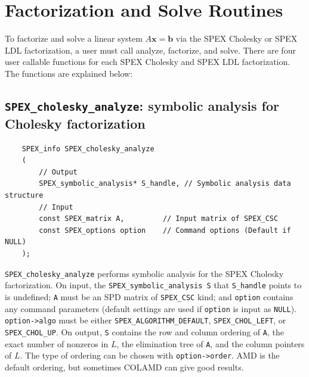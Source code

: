 \documentclass[12pt,oneside]{book}
\theoremstyle{definition}
\begin{document}
\section{Factorization and Solve Routines}

To factorize and solve a linear system $A \mathbf{x} = \mathbf{b}$ via the SPEX Cholesky or SPEX LDL factorization, a user must call analyze, factorize, and solve. There are four user callable functions for each SPEX Cholesky and SPEX LDL factorization. The functions are explained below:


\subsection{\texttt{SPEX\_cholesky\_analyze}: symbolic analysis for Cholesky factorization} \label{ss:spex_chol_analyze}
\begin{mdframed}[userdefinedwidth=\textwidth]
{\footnotesize
\begin{verbatim}
    SPEX_info SPEX_cholesky_analyze
    (
        // Output
        SPEX_symbolic_analysis* S_handle, // Symbolic analysis data structure 
        // Input
        const SPEX_matrix A,         // Input matrix of SPEX_CSC
        const SPEX_options option    // Command options (Default if NULL)
    );
    \end{verbatim}
} \end{mdframed}

\verb|SPEX_cholesky_analyze| performs symbolic analysis for the SPEX Cholesky factorization. On input, the \verb|SPEX_symbolic_analysis S| that  \verb|S_handle| points to is undefined;  \verb|A| must be an SPD matrix of \verb|SPEX_CSC| kind;  and \verb|option| contains any command parameters  (default settings are used if
\verb|option| is input as \verb|NULL|).  \verb|option->algo| must be either \verb|SPEX_ALGORITHM_DEFAULT|, \verb|SPEX_CHOL_LEFT|, or \verb|SPEX_CHOL_UP|. On output, \verb|S| contains the row and column ordering of \verb|A|, the exact number of nonzeros in $L$, the elimination tree of \verb|A|, and the column pointers of $L$. The type of ordering can be chosen with \verb|option->order|.   AMD is the default ordering, but sometimes COLAMD can give good results.
\end{document}
